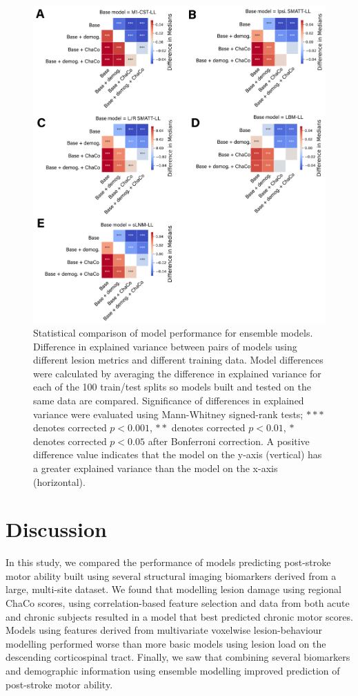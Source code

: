 \documentclass[10pt]{article}
\begin{document}
\begin{figure}[htp]
\centering
\includegraphics[width=1\linewidth]{figures/Analysis2_matrix_annot.png}
\caption{Statistical comparison of model performance for ensemble models. Difference in explained variance between pairs of models using different lesion metrics and different training data. Model differences were calculated by averaging the difference in explained variance for each of the 100 train/test splits so models built and tested on the same data are compared. Significance of differences in explained variance were evaluated using Mann-Whitney signed-rank tests; $***$ denotes corrected $p < 0.001$, $**$ denotes corrected $p < 0.01$, $*$ denotes corrected $p < 0.05$ after Bonferroni correction. A positive difference value indicates that the model on the y-axis (vertical) has a greater explained variance than the model on the x-axis (horizontal).}
\label{analysis2_matrix}
\end{figure}

\section{Discussion}
In this study, we compared the performance of models predicting post-stroke motor ability built using several structural imaging biomarkers derived from a large, multi-site dataset. We found that modelling lesion damage using regional ChaCo scores, using correlation-based feature selection and data from both acute and chronic subjects resulted in a model that best predicted chronic motor scores. Models using features derived from multivariate voxelwise lesion-behaviour modelling performed worse than more basic models using lesion load on the descending corticospinal tract. Finally, we saw that combining several biomarkers and demographic information using ensemble modelling improved prediction of post-stroke motor ability.
\end{document}
